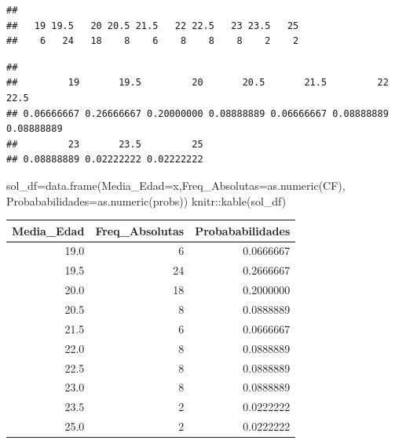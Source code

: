 \documentclass[
]{article}
\newenvironment{Shaded}{\begin{snugshade}}{\end{snugshade}}
\newcommand{\AttributeTok}[1]{\textcolor[rgb]{0.77,0.63,0.00}{#1}}
\newcommand{\FunctionTok}[1]{\textcolor[rgb]{0.00,0.00,0.00}{#1}}
\newcommand{\NormalTok}[1]{#1}
\newcommand{\OtherTok}[1]{\textcolor[rgb]{0.56,0.35,0.01}{#1}}
\newcommand{\SpecialCharTok}[1]{\textcolor[rgb]{0.00,0.00,0.00}{#1}}
\begin{document}
\begin{Shaded}
\end{Shaded}

\begin{verbatim}
## 
##   19 19.5   20 20.5 21.5   22 22.5   23 23.5   25 
##    6   24   18    8    6    8    8    8    2    2
\end{verbatim}

\begin{Shaded}
\end{Shaded}

\begin{verbatim}
## 
##         19       19.5         20       20.5       21.5         22       22.5 
## 0.06666667 0.26666667 0.20000000 0.08888889 0.06666667 0.08888889 0.08888889 
##         23       23.5         25 
## 0.08888889 0.02222222 0.02222222
\end{verbatim}

\begin{Shaded}
\begin{Highlighting}[]
\NormalTok{sol\_df}\OtherTok{=}\FunctionTok{data.frame}\NormalTok{(}\AttributeTok{Media\_Edad=}\NormalTok{x,}\AttributeTok{Freq\_Absolutas=}\FunctionTok{as.numeric}\NormalTok{(CF),}
                  \AttributeTok{Probababilidades=}\FunctionTok{as.numeric}\NormalTok{(probs))}
\NormalTok{knitr}\SpecialCharTok{::}\FunctionTok{kable}\NormalTok{(sol\_df)}
\end{Highlighting}
\end{Shaded}

\begin{longtable}[]{@{}rrr@{}}
\toprule
Media\_Edad & Freq\_Absolutas & Probababilidades \\
\midrule
\endhead
19.0 & 6 & 0.0666667 \\
19.5 & 24 & 0.2666667 \\
20.0 & 18 & 0.2000000 \\
20.5 & 8 & 0.0888889 \\
21.5 & 6 & 0.0666667 \\
22.0 & 8 & 0.0888889 \\
22.5 & 8 & 0.0888889 \\
23.0 & 8 & 0.0888889 \\
23.5 & 2 & 0.0222222 \\
25.0 & 2 & 0.0222222 \\
\bottomrule
\end{longtable}
\end{document}
